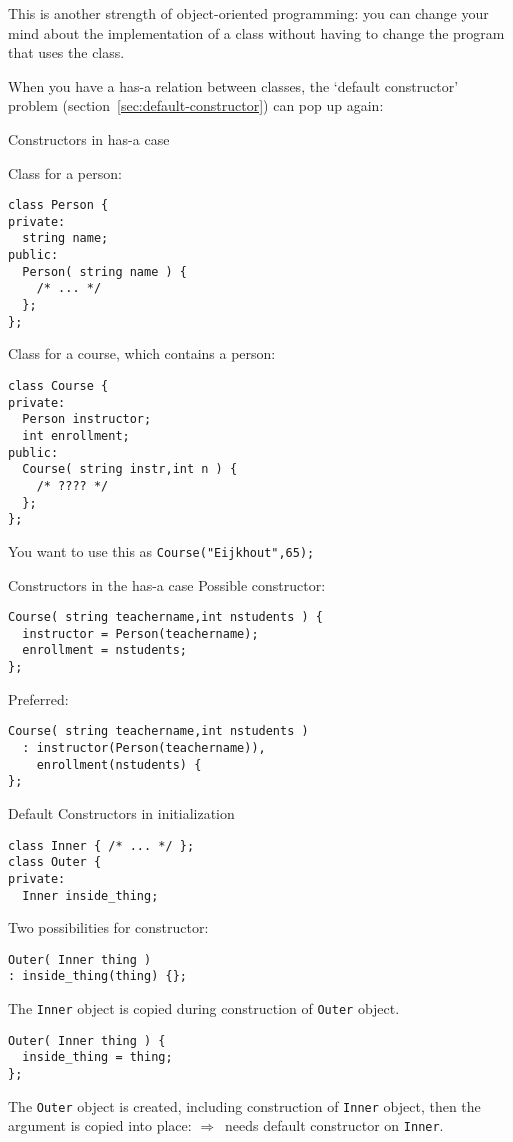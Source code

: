 This is another strength of object-oriented programming: you can
change your mind about the implementation of a class without having
to change the program that uses the class.

When you have a has-a relation between classes, the `default
constructor' problem (section~\ref{sec:default-constructor}) can pop
up again:

\begin{block}{Constructors in has-a case}
  \label{sl:hasa-construct-1}
\begin{multicols}{2}
Class for a person:
\begin{lstlisting}
class Person {
private:
  string name;
public:
  Person( string name ) {
    /* ... */
  };
};
\end{lstlisting}
\columnbreak
Class for a course, which contains a person:
\begin{lstlisting}
class Course {
private:
  Person instructor;
  int enrollment;
public:
  Course( string instr,int n ) {
    /* ???? */
  };
};
\end{lstlisting}
\end{multicols}
You want to use this as \lstinline+Course("Eijkhout",65);+
\end{block}

\begin{block}{Constructors in the has-a case}
  \label{sl:hasa-construct-2}
  Possible constructor:
\begin{lstlisting}
Course( string teachername,int nstudents ) {
  instructor = Person(teachername);
  enrollment = nstudents;
};
\end{lstlisting}
Preferred:
\begin{lstlisting}
Course( string teachername,int nstudents )
  : instructor(Person(teachername)),
    enrollment(nstudents) {
};
\end{lstlisting}
\end{block}

\begin{block}{Default Constructors in initialization}
  \label{sl:member-init-def-construct}
\begin{lstlisting}
class Inner { /* ... */ };
class Outer {
private:
  Inner inside_thing;
\end{lstlisting}
Two possibilities for constructor:
\begin{multicols}{2}
\begin{lstlisting}
Outer( Inner thing )
: inside_thing(thing) {};
\end{lstlisting}
The \lstinline{Inner} object is copied during construction
of \lstinline{Outer} object.
\par\vfill\hbox{}

\columnbreak

\begin{lstlisting}
Outer( Inner thing ) {
  inside_thing = thing;
};
\end{lstlisting}
The \lstinline{Outer} object is created, including construction of
\lstinline{Inner} object, then the argument is copied into place:
$\Rightarrow$~needs default constructor on \lstinline{Inner}.

\end{multicols}
\end{block}

